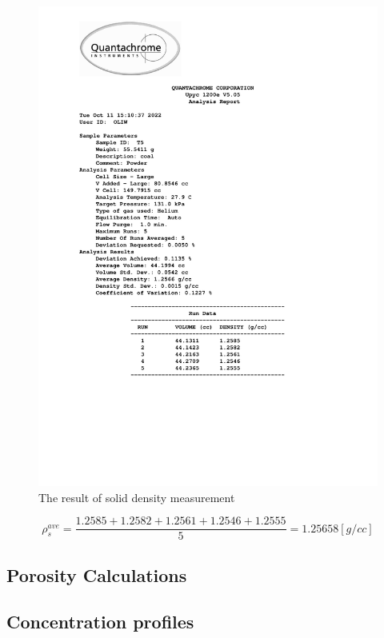 \documentclass[a4paper,fleqn]{cas-dc}
\begin{document}
\begin{figure}[!h]
	\centering 
	\includegraphics[trim=2cm 6cm 4cm 0cm, clip,width=\columnwidth]{Sections/ultraReportT5.pdf}
	\caption{The result of solid density measurement}
\end{figure}

{\footnotesize
	\begin{equation*}
		\rho_s^{ave} = \frac{1.2585+1.2582+1.2561+1.2546+1.2555}{5} = 1.25658 [g/cc]
	\end{equation*}
}

\subsection{Porosity Calculations} \label{CH: Porosity}


\subsection{Concentration profiles} \label{CH: Profiles}

\end{document}

